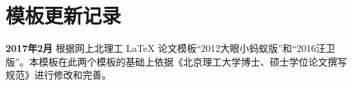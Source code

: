 \chapter{模板更新记录}
\label{chap:updatelog}

\textbf{2017年2月} 根据网上北理工 \LaTeX{} 论文模板“2012大眼小蚂蚁版”和“2016汪卫版”。本模板在此两个模板的基础上依据《北京理工大学博士、硕士学位论文撰写规范》进行修改和完善。
